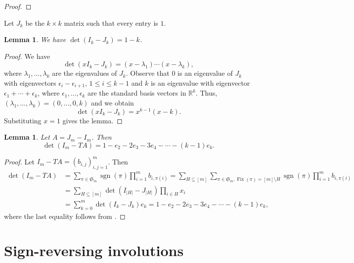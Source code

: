 \documentclass[oneside]{book}
\numberwithin{equation}{section}
\newtheorem{lem}[thm]{Lemma}
\theoremstyle{definition}
\newcommand\Fix{\operatorname{Fix}}
\newcommand\sgn{\operatorname{sgn}}
\newcommand\sym{\mathfrak{S}}
\newcommand{\RR}{\mathbb{R}}
\begin{document}
\begin{proof}


\end{proof}

Let \( J_k \) be the \( k\times k \) matrix such that every entry is
\( 1 \).

\begin{lem}\label{lem:12}
  We have \( \det(I_{k}-J_{k}) = 1-k \). 
\end{lem}

\begin{proof}
  We have
  \[
    \det(xI_{k}-J_{k}) = (x-\lambda_1) \cdots (x-\lambda_k),
  \]
  where \( \lambda_1,\dots,\lambda_k \) are the eigenvalues of
  \( J_k \). Observe that \( 0 \) is an eigenvalue of \( J_k \) with
  eigenvectors \( \epsilon_i-\epsilon_{i+1} \), \( 1\le i\le k-1 \)
  and \( k \) is an eigenvalue with eigenvector
  \( \epsilon_1 + \cdots + \epsilon_k \), where
  \( \epsilon_1,\dots,\epsilon_k \) are the standard basis vectors in
  \( \RR^k \). Thus, \( (\lambda_1,\dots,\lambda_k) = (0,\dots,0,k) \)
  and we obtain
  \[
    \det(xI_{k}-J_{k}) = x^{k-1}(x-k).
  \]
  Substituting \( x=1 \) gives the lemma.
\end{proof}

\begin{lem}
  Let \( A = J_m-I_m \). Then
  \[
    \det(I_{m}-TA) = 1-e_2-2e_3-3e_4-\cdots-(k-1)e_k.
  \]
\end{lem}

\begin{proof}
 Let \( I_{m}-TA = (b_{i,j})_{i,j=1}^m \).
 Then
  \begin{align*}
    \det(I_{m}-TA)
    &= \sum_{\pi\in \sym_m}  \sgn(\pi) \prod_{i=1}^m b_{i,\pi(i)}
    = \sum_{H\subseteq [m]}\sum_{\pi\in \sym_m, \Fix(\pi) = [m]\setminus H}  \sgn(\pi) \prod_{i=1}^m b_{i,\pi(i)}\\
    &= \sum_{H\subseteq [m]} \det(I_{|H|}-J_{|H|}) \prod_{i\in H} x_i\\
    &= \sum_{k=0}^{m} \det(I_{k}-J_{k}) e_k = 1-e_2-2e_3-3e_4-\cdots-(k-1)e_k,
  \end{align*}
  where the last equality follows from .
\end{proof}

\newpage

\appendix

\chapter{Sign-reversing involutions}
\label{sec:sign-revers-invol}
\end{document}
